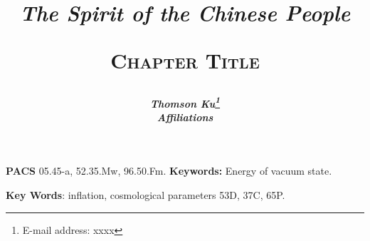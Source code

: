 \documentclass[11pt,twoside,letterpaper]{book} %
\newcommand{\doctitle}{The Spirit of the Chinese People}
\newcommand{\docauthor}{Thomson Ku}
\newcommand{\doctitle}{春秋大義}
\newcommand{\docauthor}{辜鴻銘}
\begin{document}
\title{
{\begin{flushleft}
\vskip 0.45in
{\normalsize\bfseries\textit{\doctitle}}
\end{flushleft}
\vskip 0.45in
\bfseries\scshape Chapter Title}}
\author{\bfseries\itshape \docauthor\thanks{E-mail address: xxxx}\\
Affiliations}
\date{}
\maketitle
\thispagestyle{empty}
\setcounter{page}{1}
\thispagestyle{fancy}
\fancyhead{}
\fancyfoot{}
\renewcommand{\headrulewidth}{0pt}

\vspace{2in}

\noindent \textbf{PACS} 05.45-a, 52.35.Mw, 96.50.Fm.
\vspace{.08in} \noindent \textbf{Keywords:} Energy of vacuum state.

\noindent \textbf{Key Words}: inflation, cosmological parameters
\vspace{.08in}  53D, 37C, 65P.



\pagestyle{fancy}
\fancyhead{}
\fancyhead[EL,OR]{\thepage}
\fancyfoot{}
\renewcommand\headrulewidth{0.5pt} 



\raggedbottom                         %


\end{document}
